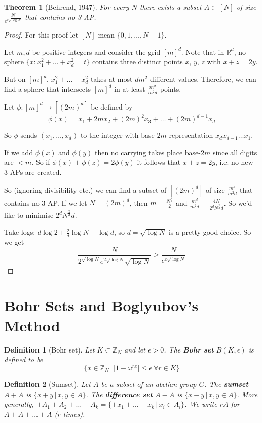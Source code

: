 \documentclass[a4paper]{article}
\newtheorem*{definition}{Definition}
\newtheorem{theorem}[lemma]{Theorem}
\newcommand*\abs[1]{\left|#1\right|}
\begin{document}
\begin{theorem}[Behrend, 1947]
	For every $N$ there exists a subset $A \subset [N]$ of size $\frac{N}{e^{c\sqrt{\log N}}}$ that contains no 3-AP.
\end{theorem}
\begin{proof}
	For this proof let $[N]$ mean $\{0,1,\dots,N-1\}$.
	
	Let $m, d$ be positive integers and consider the grid $[m]^{d}$. Note that in $\mathbb{R}^d$, no sphere $\{x: x_1^2 + \dots + x_d^2 =t \}$ contains three distinct points $x$, $y$, $z$ with $x+z=2y$.
	
	But on $[m]^d$, $x_1^2+ \dots + x_d ^2$ takes at most $dm^2$ different values. Therefore, we can find a sphere that intersects $[m]^d$ in at least $\frac{m^d}{m^2d}$ points.
	
	Let $\phi: [m]^d \to [(2m)^d]$ be defined by $$\phi(x) = x_1 + 2mx_2 + (2m)^2x_3 + \dots + (2m)^{d-1}x_d$$
	
	So $\phi$ sends $(x_1, \dots, x_d)$ to the integer with base-$2m$ representation $x_dx_{d-1}\dots x_1$.
	
	If we add $\phi(x)$ and $\phi(y)$ then no carrying takes place base-$2m$ since all digits are $<m$. So if $\phi(x) + \phi(z) = 2\phi(y)$ it follows that $x+z=2y$, i.e. no new 3-APs are created.
	
	So (ignoring divisibility etc.) we can find a subset of $[(2m)^d]$ of size $\frac{m^d}{m^2d}$ that contains no 3-AP. If we let $N=(2m)^d$, then $m=\frac{N^{\frac{1}{d}}}{2}$ and $\frac{m^d}{m^2d} = \frac{4N}{2^dN^\frac{2}{d}d}$. So we'd like to minimise $2^dN^\frac{2}{d}d$.
	
	Take logs: $d\log 2 + \frac{2}{d}\log N + \log d$, so $d = \sqrt{\log N}$ is a pretty good choice. So we get $$\frac{N}{2^{\sqrt{\log N}}e^{2 \sqrt{\log N}}\sqrt{\log N}} \geq \frac{N}{e^{c \sqrt{ \log N}}}$$
\end{proof}

\section{Bohr Sets and Boglyubov's Method}
\setcounter{lemma}{0}
\begin{definition}[Bohr set]
	Let $K\subset \mathbb{Z}_N$ and let $\epsilon > 0$. The \textbf{Bohr set} $B(K, \epsilon)$ is defined to be $$\{x \in \mathbb{Z}_N \,|\, \abs{1-\omega^{rx}} \leq \epsilon\ \forall r \in K \}$$
\end{definition}

\begin{definition}[Sumset]
	Let $A$ be a subset of an abelian group $G$. The \textbf{sumset} $A+A$ is $\{x+y \,|\, x, y \in A \}$. The \textbf{difference set} $A-A$ is $\{x-y \,|\, x, y \in A \}$. More generally, $\pm A_1 \pm A_2 \pm \dots \pm A_k = \{\pm x_1 \pm \dots \pm x_k \,|\, x_i \in A_i\}$. We write $rA$ for $A+A+\dots+A$ ($r$ times).
\end{definition}
\end{document}
